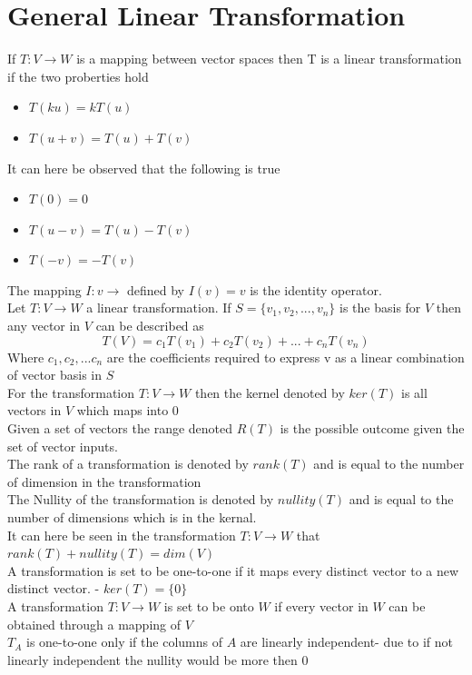 \documentclass[12pt, a4paper]{article}
\begin{document}
	\section{General Linear Transformation}
		If $T:V\rightarrow W$ is a mapping between vector spaces then T is a linear transformation if the two proberties hold
		\begin{itemize}
			\item $T(ku)=kT(u)$
			\item $T(u+v)=T(u)+T(v)$
		\end{itemize}
		It can here be observed that the following is true
		\begin{itemize}
			\item $T(0)=0$
			\item $T(u-v)=T(u)-T(v)$
			\item $T(-v)=-T(v)$
		\end{itemize}
		The mapping $I:v\rightarrow$ defined by $I(v)=v$ is the identity operator.\\
		Let $T:V\rightarrow W$ a linear transformation. If $S=\{v_1,v_2,...,v_n\}$ is the basis for $V$ then any vector in $V$ can be described as
		$$T(V)=c_1T(v_1)+c_2T(v_2)+...+c_nT(v_n)$$
		Where $c_1,c_2,...c_n$ are the coefficients required to express v as a linear combination of vector basis in $S$\\
		For the transformation $T:V\rightarrow W$ then the kernel denoted by $ker(T)$ is all vectors in $V$ which maps into $0$\\
		Given a set of vectors the range denoted $R(T)$ is the possible outcome given the set of vector inputs.\\
		The rank of a transformation is denoted by $rank(T)$ and is equal to the number of dimension in the transformation\\
		The Nullity of the transformation is denoted by $nullity(T)$ and is equal to the number of dimensions which is in the kernal.\\
		It can here be seen in the transformation $T:V\rightarrow W$ that $rank(T)+nullity(T)=dim(V)$\\
		A transformation is set to be one-to-one if it maps every distinct vector to a new distinct vector. - $ker(T)=\{0\}$\\
		A transformation $T: V\rightarrow W$ is set to be onto $W$ if every vector in $W$ can be obtained through a mapping of $V$\\
		$T_A$ is one-to-one only if the columns of $A$ are linearly independent- due to if not linearly independent the nullity would be more then 0\\[4mm]
\end{document}

